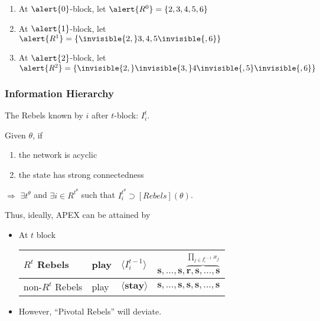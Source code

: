 \documentclass[9pt]{beamer}
\begin{document}
\begin{frame}[label=IH]
{\begin{center}
\end{center}
}



\begin{enumerate}
\item {} At $\alert{0}$-block, let $\alert{R^0}=\{2,3,4,5,6\}$
\item {} At $\alert{1}$-block, let $\alert{R^1}=\{\invisible{2,}3,4,5\invisible{,6}\}$
\item {} At $\alert{2}$-block, let $\alert{R^2}=\{\invisible{2,}\invisible{3,}4\invisible{,5}\invisible{,6}\}$
\end{enumerate}

\hyperlink{IH_details}{}

\end{frame}





\begin{frame}
  \frametitle{Information Hierarchy}

The Rebels known by $i$ after $t$-block: $I^t_i$.
\begin{theorem}
\label{lemma_empty}
Given $\theta$, if
\begin{enumerate}
\item the network is acyclic
\item the state has strong connectedness
\end{enumerate}
$\Rightarrow$ $\exists t^{\theta}$ and $\exists i\in R^{t^{\theta}}$ such that $I^{t^{\theta}}_i \supset [Rebels](\theta) $.
\end{theorem} 

\bigskip

Thus, ideally, APEX can be attained by
\begin{itemize}
\item At $t$ block

\begin{table}[h]
\begin{tabular}{l l l l}
$R^t$ Rebels & play & $\langle I^{t-1}_i\rangle$ & $\textbf{s},...,\textbf{s},\overbrace{\textbf{r},\textbf{s},...,\textbf{s}}^{\prod_{j\in I^{t-1}_i}x_j}$ \\
\hline
non-$R^t$ Rebels & play & $\langle \textbf{stay} \rangle$ & $\textbf{s},...,\textbf{s},\textbf{s},\textbf{s},...,\textbf{s}$  \\

\end{tabular}
\end{table}
\pause
\item \alert{However, ``Pivotal Rebels'' will deviate}.

\end{itemize}
\end{frame}
\end{document}
